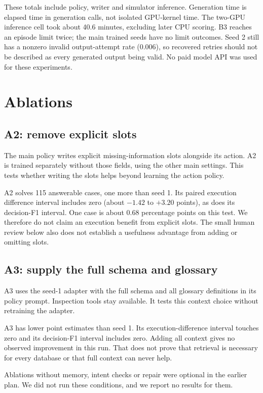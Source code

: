 \documentclass[11pt,a4paper]{article}
\begin{document}
These totals include policy, writer and simulator inference. Generation time is elapsed time in generation
calls, not isolated GPU-kernel time. The two-GPU inference cell took about 40.6 minutes, excluding later
CPU scoring. B3 reaches an episode limit twice; the main trained seeds have no limit outcomes. Seed 2
still has a nonzero invalid output-attempt rate (0.006), so recovered retries should not be described as
every generated output being valid. No paid model API was used for these experiments.

\section{Ablations}

\subsection{A2: remove explicit slots}
The main policy writes explicit missing-information slots alongside its action. A2 is trained separately
without those fields, using the other main settings. This tests whether writing the slots helps beyond
learning the action policy.

A2 solves 115 answerable cases, one more than seed 1. Its paired execution difference interval includes
zero (about $-1.42$ to $+3.20$ points), as does its decision-F1 interval. One case is about 0.68 percentage
points on this test. We therefore do not claim an execution benefit from explicit slots. The small human
review below also does not establish a usefulness advantage from adding or omitting slots.

\subsection{A3: supply the full schema and glossary}

A3 uses the seed-1 adapter with the full schema and all glossary definitions in its policy prompt.
Inspection tools stay available. It tests this context choice without retraining the adapter.

A3 has lower point estimates than seed 1. Its execution-difference interval touches zero and its decision-F1
interval includes zero. Adding all context gives no observed improvement in this run. That does not prove
that retrieval is necessary for every database or that full context can never help.

Ablations without memory, intent checks or repair were optional in the earlier plan. We did not run
these conditions, and we report no results for them.
\end{document}

